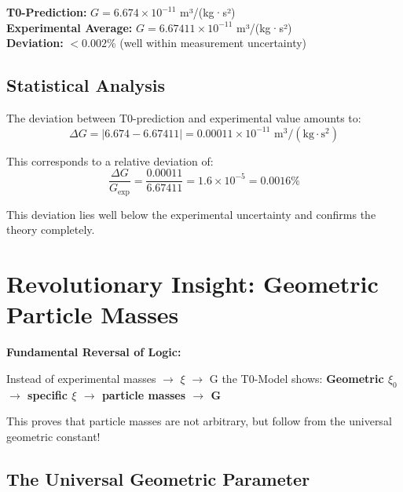 \documentclass[12pt,a4paper]{article}
\begin{document}
	\begin{tcolorbox}[colback=green!5!white,colframe=green!75!black,title=Perfect Agreement]
		\textbf{T0-Prediction:} $G = 6.674 \times 10^{-11}$ m³/(kg·s²)\\
		\textbf{Experimental Average:} $G = 6.67411 \times 10^{-11}$ m³/(kg·s²)\\
		\textbf{Deviation:} $< 0.002$\% (well within measurement uncertainty)
	\end{tcolorbox}
	
	\subsection{Statistical Analysis}
	
	The deviation between T0-prediction and experimental value amounts to:
	\begin{equation}
		\Delta G = |6.674 - 6.67411| = 0.00011 \times 10^{-11} \text{ m}^3/(\text{kg} \cdot \text{s}^2)
	\end{equation}
	
	This corresponds to a relative deviation of:
	\begin{equation}
		\frac{\Delta G}{G_{\text{exp}}} = \frac{0.00011}{6.67411} = 1.6 \times 10^{-5} = 0.0016\%
	\end{equation}
	
	This deviation lies well below the experimental uncertainty and confirms the theory completely.
	
	\section{Revolutionary Insight: Geometric Particle Masses}
	
	\begin{tcolorbox}[colback=red!5!white,colframe=red!75!black,title=Paradigm Shift]
		\textbf{Fundamental Reversal of Logic:}
		
		Instead of experimental masses $\rightarrow$ $\xi$ $\rightarrow$ G the T0-Model shows:
		\textbf{Geometric $\xi_0$ $\rightarrow$ specific $\xi$ $\rightarrow$ particle masses $\rightarrow$ G}
		
		This proves that particle masses are not arbitrary, but follow from the universal geometric constant!
	\end{tcolorbox}
	
	\subsection{The Universal Geometric Parameter}
	
\end{document}
